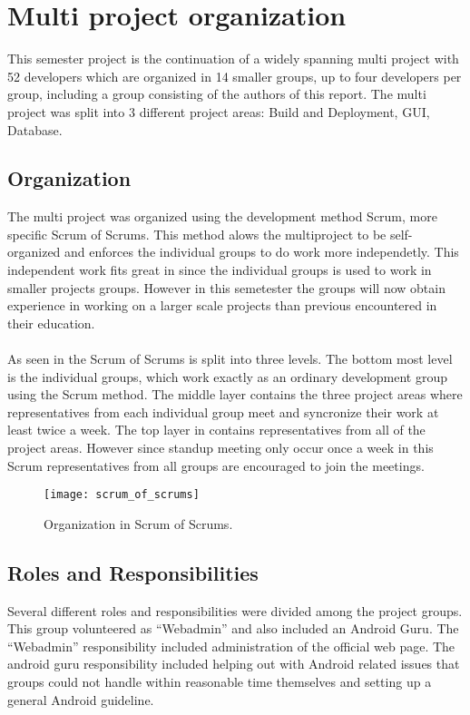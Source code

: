 
\section{Multi project organization}

This semester project is the continuation of a widely spanning multi project with 52 developers which are organized in 14 smaller groups, up to four developers per group, including a group consisting of the authors of this report. The multi project was split into 3 different project areas: Build and Deployment, GUI, Database. 

\subsection{Organization}
The multi project was organized using the development method Scrum\parencite{scrum}, more specific Scrum of Scrums. This method alows the multiproject to be self-organized and enforces the individual groups to do work more independetly. This independent work fits great in since the individual groups is used to work in smaller projects groups. However in this semetester the groups will now obtain experience in working on a larger scale projects than previous encountered in their education. 
\\\\
As seen in  the Scrum of Scrums is split into three levels. The bottom most level is the individual groups, which work exactly as an ordinary development group using the Scrum method. The middle layer contains the three project areas where representatives from each individual group meet and syncronize their work at least twice a week. The top layer in  contains representatives from all of the project areas. However since standup meeting only occur once a week in this Scrum representatives from all groups are encouraged to join the meetings.

\begin{figure}[!htbp]
  \centering
    \texttt{[image: scrum\_of\_scrums]}
    \caption{Organization in Scrum of Scrums.}
    \label{fig:scrum_of_scrums}
\end{figure}



\subsection{Roles and Responsibilities}
Several different roles and responsibilities were divided among the project groups. This group volunteered as ``Webadmin'' and also included an Android Guru. The ``Webadmin'' responsibility included administration of the official \giraf web page. The android guru responsibility included helping out with Android related issues that groups could not handle within reasonable time themselves and setting up a general Android guideline. 